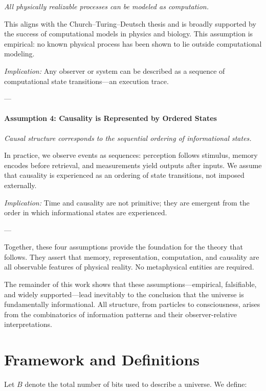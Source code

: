 \documentclass[12pt]{article}
\begin{document}
\emph{All physically realizable processes can be modeled as computation.}

\vspace{0.2em}
This aligns with the Church–Turing–Deutsch thesis and is broadly supported by the success of computational models in physics and biology. This assumption is empirical: no known physical process has been shown to lie outside computational modeling.

\emph{Implication:} Any observer or system can be described as a sequence of computational state transitions—an execution trace.

---

\paragraph{Assumption 4: Causality is Represented by Ordered States}

\emph{Causal structure corresponds to the sequential ordering of informational states.}

\vspace{0.2em}
In practice, we observe events as sequences: perception follows stimulus, memory encodes before retrieval, and measurements yield outputs after inputs. We assume that causality is experienced as an ordering of state transitions, not imposed externally.

\emph{Implication:} Time and causality are not primitive; they are emergent from the order in which informational states are experienced.

---

Together, these four assumptions provide the foundation for the theory that follows. They assert that memory, representation, computation, and causality are all observable features of physical reality. No metaphysical entities are required.

The remainder of this work shows that these assumptions—empirical, falsifiable, and widely supported—lead inevitably to the conclusion that the universe is fundamentally informational. All structure, from particles to consciousness, arises from the combinatorics of information patterns and their observer-relative interpretations.


\section{Framework and Definitions}

Let $B$ denote the total number of bits used to describe a universe. We define:
\end{document}
